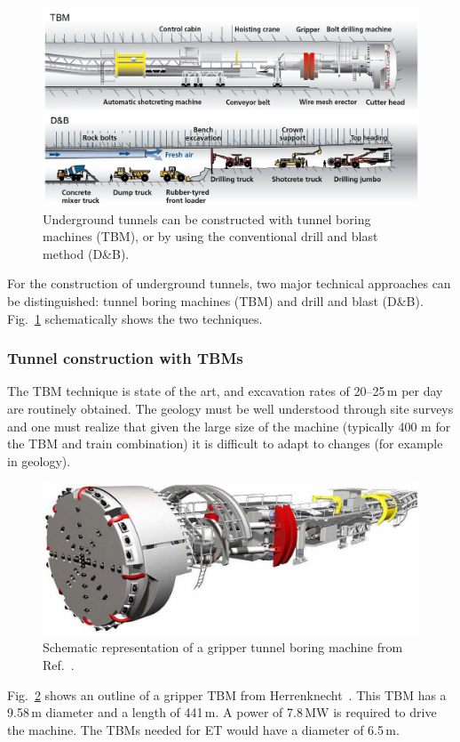 \begin{figure}[htbp!]
\centering
\includegraphics[width=16cm]{./Sec_SiteInfra/Figures/tunneling.jpg}
\caption{Underground tunnels can be constructed with tunnel boring machines (TBM),
or by using the conventional drill and blast method (D\&B).}
\label{fig:tunneling}
\end{figure}

For the construction of underground tunnels, two major technical
approaches can be distinguished: tunnel boring machines (TBM) and
drill and blast (D\&B). Fig.~\ref{fig:tunneling} schematically shows
the two techniques.

\subsubsection*{Tunnel construction with TBMs}

The TBM technique is state of the art, and excavation rates of 20--25\,m per day
are routinely obtained. The geology must be well understood through site
surveys and one must realize that given the large size of the machine
(typically 400 m for the TBM and train combination) it is difficult to adapt to
changes (for example in geology). 

\begin{figure}[htbp!]
\centering
\includegraphics[width=14cm]{./Sec_SiteInfra/Figures/tbm.jpg}
\caption{Schematic representation of a gripper tunnel boring machine from Ref.~\cite{Herrenknecht}.}
\label{fig:tbm}
\end{figure}
Fig.~\ref{fig:tbm} shows an outline of a gripper TBM from Herrenknecht~\cite{Herrenknecht}.
This TBM has a 9.58\,m diameter and a length of 441\,m.  A power of 7.8\,MW is required
to drive the machine. The TBMs needed for ET would have a diameter of 6.5\,m.

